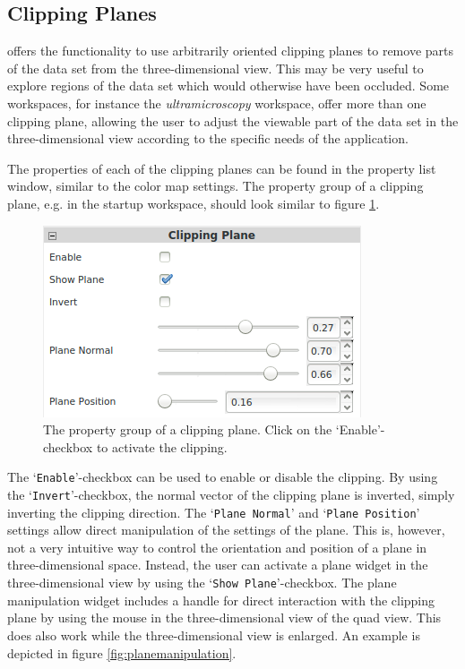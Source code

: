 \subsection{Clipping Planes}
\label{section:clipping_planes}

\Voreen offers the functionality to use arbitrarily oriented clipping planes to remove parts of the data set from the 
three-dimensional view. This may be very useful to explore regions of the data set which would otherwise have been occluded.
Some workspaces, for instance the \emph{ultramicroscopy} workspace, offer more than one clipping plane, allowing the user
to adjust the viewable part of the data set in the three-dimensional view according to the specific needs of the application.

The properties of each of the clipping planes can be found in the property list window, similar to the color map settings.
The property group of a clipping plane, e.g. in the startup workspace, should look similar to figure \ref{fig:clipplane_properties}.

\begin{figure}[htb]
 \centering
 \includegraphics[scale=0.6,keepaspectratio=true]{./images/clipplane_properties.png}
 \caption{The property group of a clipping plane. Click on the `Enable'-checkbox to activate the clipping.}
 \label{fig:clipplane_properties}
\end{figure}

The `\verb|Enable|'-checkbox can be used to enable or disable the clipping. By using the `\verb|Invert|'-checkbox, the normal vector
of the clipping plane is inverted, simply inverting the clipping direction. The `\verb|Plane Normal|' and `\verb|Plane Position|' settings
allow direct manipulation of the settings of the plane. This is, however, not a very intuitive way to control the orientation and position
of a plane in three-dimensional space. Instead, the user can activate a plane widget in the three-dimensional view by using the 
`\verb|Show Plane|'-checkbox. The plane manipulation widget includes a handle for direct interaction with the clipping plane 
by using the mouse in the three-dimensional view of the quad view. This does also work while the three-dimensional view
is enlarged. An example is depicted in figure \ref{fig:planemanipulation}.

